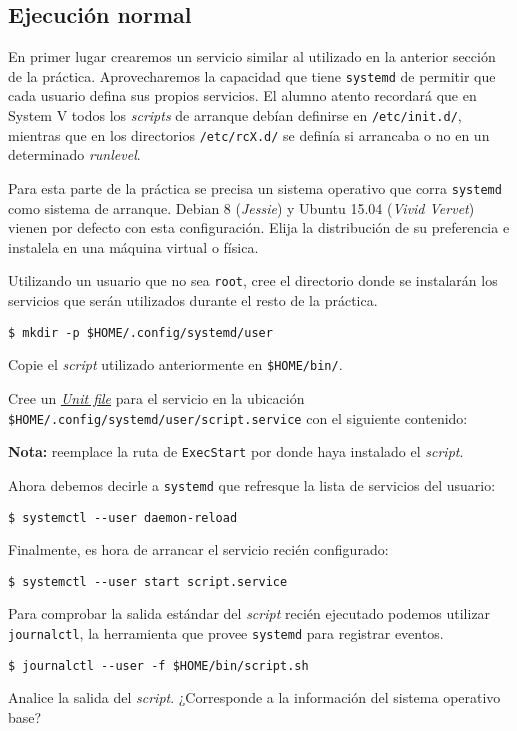 \subsection{Ejecución normal}
En primer lugar crearemos un servicio similar al utilizado en la anterior
sección de la práctica. Aprovecharemos la capacidad que tiene
\texttt{systemd} de permitir que cada usuario defina sus propios
servicios. El alumno atento recordará que en System V todos los
\textit{scripts} de arranque debían definirse en \texttt{/etc/init.d/},
mientras que en los directorios \texttt{/etc/rcX.d/} se definía si
arrancaba o no en un determinado \textit{runlevel}.
\begin{questions}
  \question Para esta parte de la práctica se precisa un sistema operativo
  que corra \texttt{systemd} como sistema de arranque. Debian 8
  (\textit{Jessie}) y Ubuntu 15.04 (\textit{Vivid Vervet}) vienen por
  defecto con esta configuración. Elija la distribución de su preferencia e
  instalela en una máquina virtual o física.

  \question Utilizando un usuario que no sea \texttt{root}, cree el
  directorio donde se instalarán los servicios que serán utilizados durante
  el resto de la práctica.
\begin{verbatim}
$ mkdir -p $HOME/.config/systemd/user
\end{verbatim}

  \question Copie el \textit{script} utilizado anteriormente en
  \texttt{\$HOME/bin/}.

  \question Cree un
  \textit{\href{http://0pointer.de/public/systemd-man/systemd.unit.html}{Unit
      file}} para el servicio en la ubicación
  \texttt{\$HOME/.config/systemd/user/script.service} con el siguiente
  contenido:
  

  \textbf{Nota:} reemplace la ruta de \texttt{ExecStart} por donde haya
  instalado el \textit{script}. %
  
  \question Ahora debemos decirle a \texttt{systemd} que refresque la lista
  de servicios del usuario:
\begin{verbatim}
$ systemctl --user daemon-reload
\end{verbatim}

    \question Finalmente, es hora de arrancar el servicio recién configurado:
\begin{verbatim}
$ systemctl --user start script.service
\end{verbatim}

    \question Para comprobar la salida estándar del \textit{script} recién
    ejecutado podemos utilizar \texttt{journalctl}, la herramienta que
    provee \texttt{systemd} para registrar eventos.
\begin{verbatim}
$ journalctl --user -f $HOME/bin/script.sh
\end{verbatim}

    Analice la salida del \textit{script}. ¿Corresponde a la información
    del sistema operativo base?   

\end{questions}

